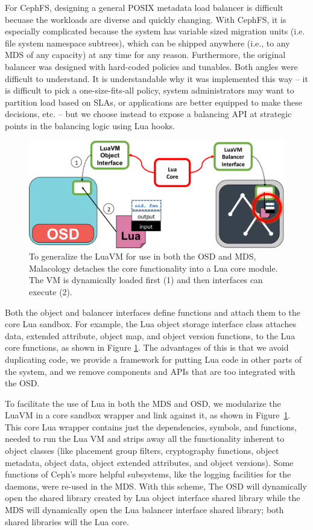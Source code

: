 \documentclass[10pt,twocolumn]{article}
\begin{document}
For CephFS, designing a general POSIX metadata load balancer is difficult becuase the workloads are diverse and quickly changing. With CephFS, it is especially complicated because the system has variable sized migration units (i.e. file system namespace subtrees), which can be shipped anywhere (i.e., to any MDS of any capacity) at any time for any reason. Furthermore, the original balancer was designed with hard-coded policies and tunables. Both angles were difficult to understand. It is understandable why it was implemented this way -- it is difficult to pick a one-size-fits-all policy, system administrators may want to partition load based on SLAs, or applications are better equipped to make these decisions, etc. -- but we choose instead to expose a balancing API at strategic points in the balancing logic using Lua hooks. 

\begin{figure}[htbp]
\centering
\includegraphics{figures/cls-osd-mds.png}
\caption{To generalize the LuaVM for use in both the OSD and MDS,
Malacology detaches the core functionality into a Lua core module. The
VM is dynamically loaded first (1) and then interfaces can execute (2).
\label{fig:cls-osd-mds}}
\end{figure}

Both the object and balancer interfaces define functions and attach them
to the core Lua sandbox. For example, the Lua object storage interface
class attaches data, extended attribute, object map, and object version
functions, to the Lua core functions, as shown in Figure
\ref{fig:cls-osd-mds}. The advantages of this is that we avoid
duplicating code, we provide a framework for putting Lua code in other
parts of the system, and we remove components and APIs that are too
integrated with the OSD.

To facilitate the use of Lua in both the MDS and OSD, we modularize the LuaVM in a core sandbox wrapper and link against it, as shown in Figure~\ref{fig:cls-osd-mds}. This core Lua wrapper contains
just the dependencies, symbols, and functions, needed to run the Lua VM and strips away all the functionality inherent to object classes (like placement group filters, cryptography functions, object metadata,  object data, object extended attributes, and object versions). Some functions of Ceph's more helpful subsystems, like the logging facilities for the daemons, were re-used in the MDS.  With this scheme, The OSD will dynamically open the shared library created by Lua object interface shared library while the MDS will dynamically open the Lua balancer interface shared
library; both shared libraries will the Lua core.
\end{document}
